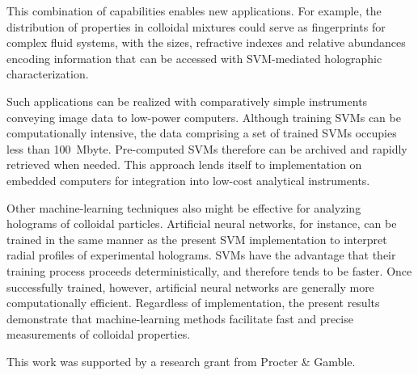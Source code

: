 This combination of capabilities enables new applications.
For example, the distribution of properties in colloidal mixtures
could serve as fingerprints for complex fluid systems, with the
sizes, refractive indexes and relative abundances encoding information
that can be accessed with SVM-mediated holographic
characterization.

Such applications can be realized with comparatively
simple instruments \cite{krishnatreya14} conveying image data
to low-power computers.
Although training SVMs can be computationally intensive,
the data comprising a set of trained SVMs occupies less
than \SI{100}{\mega byte}.
Pre-computed SVMs therefore can be archived and rapidly
retrieved when needed.
This approach lends itself to
implementation on embedded computers for integration into
low-cost analytical instruments.

Other machine-learning techniques also might be effective
for analyzing holograms of colloidal particles.  Artificial
neural networks, for instance, can be trained in the same
manner as the present SVM implementation to interpret
radial profiles of experimental holograms.  SVMs have the advantage
that their training process proceeds deterministically, and therefore
tends to be faster.  Once successfully trained, however, artificial
neural networks are generally more computationally efficient.
Regardless of implementation, the present results demonstrate
that machine-learning methods facilitate
fast and precise measurements of colloidal properties.


This work was supported by a research grant from Procter \& Gamble.
